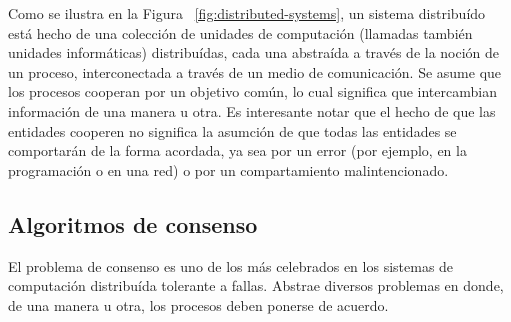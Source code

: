 Como se ilustra en la Figura ~\ref{fig:distributed-systems}, un sistema distribuído está hecho de una
colección de unidades de computación (llamadas también unidades informáticas) distribuídas, cada una
abstraída a través de la noción de un proceso, interconectada a través de un medio de comunicación.
Se asume que los procesos cooperan por un objetivo común, lo cual significa que intercambian
información de una manera u otra. Es interesante notar que el hecho de que las entidades
cooperen no significa la asumción de que todas las entidades se comportarán de la forma
acordada, ya sea por un error (por ejemplo, en la programación o en una red) o por un compartamiento
malintencionado. 



\subsection{Algoritmos de consenso}\label{subsubsec:consensus}
El problema de consenso es uno de los más celebrados en los sistemas de computación distribuída tolerante a fallas.
%
Abstrae diversos problemas en donde, de una manera u otra, los procesos deben ponerse de acuerdo.
%

